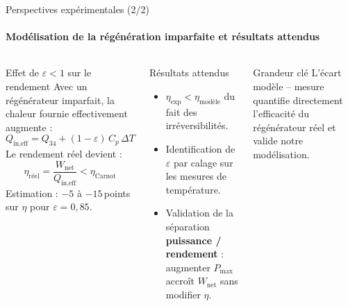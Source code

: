 \documentclass[aspectratio=43, 10pt]{beamer}
\newcommand{\etaC}{\eta_{\text{Carnot}}}
\newcommand{\Wnet}{W_{\text{net}}}
\begin{document}
\begin{frame}{Perspectives exp\'erimentales (2/2)}
  \framesubtitle{Mod\'elisation de la r\'eg\'en\'eration imparfaite et r\'esultats attendus}

  \begin{columns}[T,onlytextwidth]
      \begin{alertblock}{Effet de $\varepsilon < 1$ sur le rendement}
        \small
        Avec un r\'eg\'en\'erateur imparfait, la chaleur
        fournie effectivement augmente :
        \[
          Q_{\text{in,eff}}
          = Q_{34} + (1-\varepsilon)\,C_p\,\Delta T
        \]
        Le rendement r\'eel devient :
        \[
          \eta_{\text{r\'eel}}
          = \frac{\Wnet}{Q_{\text{in,eff}}}
          < \etaC
        \]
        \footnotesize
        Estimation : $-5$ \`a $-15$\,points sur $\eta$
        pour $\varepsilon = 0{,}85$.
      \end{alertblock}

      \begin{block}{R\'esultats attendus}
        \small
        \begin{itemize}\itemsep3pt
          \item $\eta_{\text{exp}} < \eta_{\text{mod\`ele}}$
                du fait des irr\'eversibilit\'es.
          \item Identification de $\varepsilon$ par
                calage sur les mesures de temp\'erature.
          \item Validation de la s\'eparation
                \textbf{puissance / rendement} :
                augmenter $P_{\max}$ accro\^it $\Wnet$
                sans modifier $\eta$.
        \end{itemize}
      \end{block}

      \vspace{0.4em}
      \begin{exampleblock}{Grandeur cl\'e}
        \small
        L'\'ecart mod\`ele -- mesure quantifie
        directement l'efficacit\'e du r\'eg\'en\'erateur
        r\'eel et valide notre mod\'elisation.
      \end{exampleblock}
  \end{columns}

\end{frame}

\appendix
\end{document}
